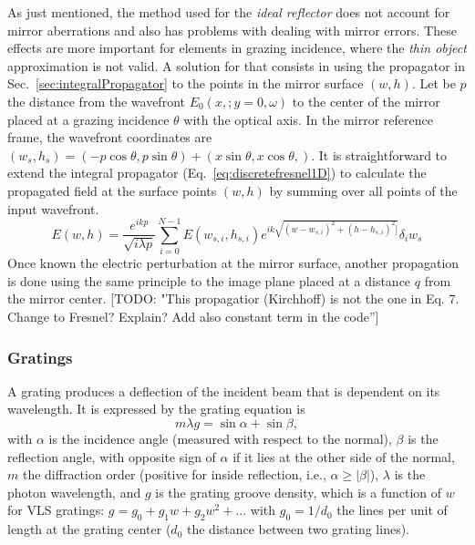 \documentclass[]{spie}  %
\newcommand{\todo}[1]{{\color{red}[TODO: "#1'']}}
\begin{document}
As just mentioned, the method used for the {\it ideal reflector} does not account for mirror aberrations and also has problems with dealing with mirror errors. These effects are more important for elements in grazing incidence, where the {\it thin object} approximation is not valid. A solution for that consists in using the propagator in Sec.~\ref{sec:integralPropagator} to the points in the mirror surface $(w,h)$. Let be $p$ the distance from the wavefront $E_0(x,;y=0,\omega)$ to the center of the mirror placed at a grazing incidence $\theta$ with the optical axis. In the mirror reference frame, the wavefront coordinates are $(w_s, h_s) =(-p \cos \theta, p \sin \theta) + (x \sin \theta, x \cos \theta,)$. It is straightforward to extend the integral propagator (Eq.~\ref{eq:discretefresnel1D}) to calculate the propagated field at the surface points $(w,h)$ by summing over all points of the input wavefront. 
\begin{equation}\label{eq:grazingPropagator}
 E(w,h) = \frac {e^{i k p }}{ \sqrt{i \lambda p}} \sum_{i=0}^{N-1}  E(w_{s,i},h_{s,i}) e^{i k \sqrt{(w - w_{s,i})^2 + (h - h_{s,i})^2]}} \delta_i w_s
\end{equation}
Once known the electric perturbation at the mirror surface, another propagation is done using the same principle to the image plane placed at a distance $q$ from the  mirror center. \todo{This propagatior (Kirchhoff) is not the one in Eq. 7. Change to Fresnel? Explain? Add also constant term in the code}

\subsubsection{Gratings}
\label{sec:grating}


A grating produces a deflection of the incident beam that is dependent on its wavelength. It is expressed by the grating equation is
\begin{equation}
    m \lambda g = \sin\alpha + \sin\beta,
\end{equation}
with $\alpha$ is the incidence angle (measured with respect to the normal), $\beta$ is the reflection angle, with opposite sign of $\alpha$ if it lies at the other side of the normal, $m$ the diffraction order (positive for inside reflection, i.e., $\alpha \ge |\beta|$),
$\lambda$ is the photon wavelength, and $g$ is the grating groove density, which is a function of $w$ for VLS gratings: $g = g_0 + g_1 w + g_2 w^2 + ...$ with $g_0 = 1/d_0$ the lines per unit of length at the grating center ($d_0$ the distance between two grating lines).
\end{document}
